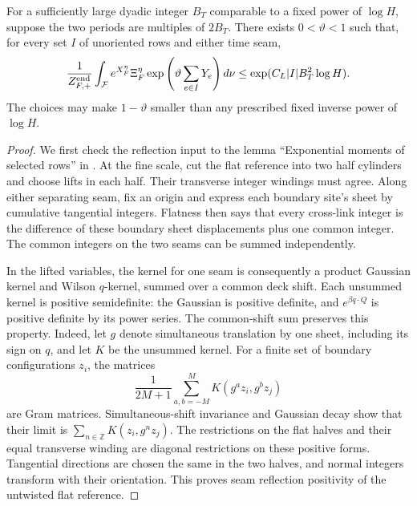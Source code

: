 \begin{lemma}
\label{lem:comparison-row-moments}
For a sufficiently large dyadic integer \(B_T\) comparable to a fixed
power of \(\log H\), suppose the two periods are multiples of \(2B_T\).  There exists \(0<\vartheta<1\)
such that, for every set \(I\) of unoriented rows and either time seam,
\begin{equation}
 \frac{1}{Z_{F,+}^{\rm end}}
 \int_{\mathcal F}e^{X_F^\eta}\Xi_F^\eta
       \exp\left(\vartheta\sum_{e\in I}Y_e\right)d\nu
 \le \exp(C_L|I|B_T^2\log H).
 \label{eq:R16}
\end{equation}
The choices may make \(1-\vartheta\) smaller than any prescribed fixed
inverse power of \(\log H\).
\end{lemma}

\begin{proof}
We first check the reflection input to the lemma ``Exponential moments
of selected rows'' in \cite[Lemma~7.3 and Equation~(7.5), Section
``Integrated comparison of endpoint densities'']{O3Continuum}.
At the fine scale, cut the flat reference into
two half cylinders and choose lifts in each half.  Their transverse
integer windings must agree.  Along either separating seam, fix an
origin and express each boundary site's sheet by cumulative tangential
integers.  Flatness then says that every cross-link integer is the
difference of these boundary sheet displacements plus one common
integer.  The common integers on the two seams can be summed independently.

In the lifted variables, the kernel for one seam is consequently a
product Gaussian kernel and Wilson \(q\)-kernel, summed over a common
deck shift.  Each unsummed kernel is positive semidefinite:
the Gaussian is positive definite, and
\(e^{\beta q\cdot Q}\) is positive definite by its power series.
The common-shift sum preserves this property.  Indeed, let \(g\)
denote simultaneous translation by one sheet, including its sign on
\(q\), and let \(K\) be the unsummed kernel.  For a finite set of
boundary configurations \(z_i\), the matrices
\[
 \frac1{2M+1}\sum_{a,b=-M}^{M}
       K(g^az_i,g^bz_j)
\]
are Gram matrices.  Simultaneous-shift invariance and Gaussian decay
show that their limit is \(\sum_{n\in\mathbb Z}K(z_i,g^nz_j)\).
The restrictions on the flat halves and their equal transverse winding
are diagonal restrictions on these positive forms.  Tangential
directions are chosen the same in the two halves, and normal integers
transform with their orientation.  This proves seam reflection
positivity of the untwisted flat reference.


\end{proof}
